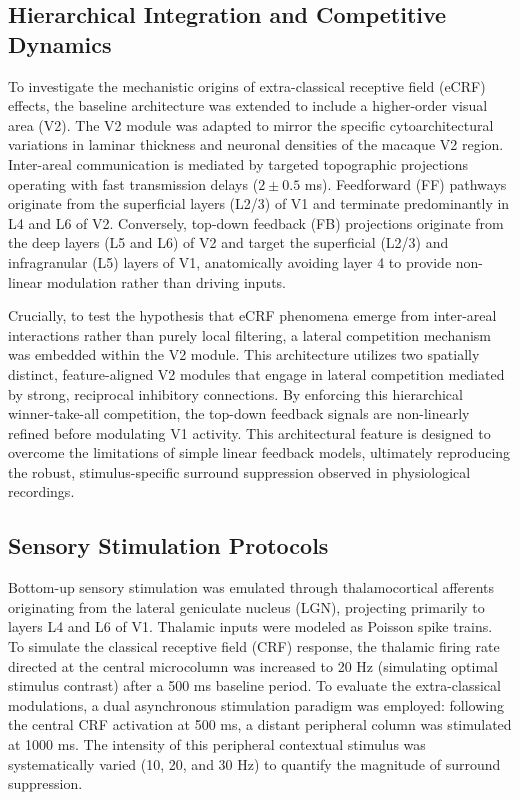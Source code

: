 \subsection{Hierarchical Integration and Competitive Dynamics}
To investigate the mechanistic origins of extra-classical receptive field (eCRF) effects, the baseline architecture was extended to include a higher-order visual area (V2). The V2 module was adapted to mirror the specific cytoarchitectural variations in laminar thickness and neuronal densities of the macaque V2 region. Inter-areal communication is mediated by targeted topographic projections operating with fast transmission delays ($2 \pm 0.5$ ms). Feedforward (FF) pathways originate from the superficial layers (L2/3) of V1 and terminate predominantly in L4 and L6 of V2. Conversely, top-down feedback (FB) projections originate from the deep layers (L5 and L6) of V2 and target the superficial (L2/3) and infragranular (L5) layers of V1, anatomically avoiding layer 4 to provide non-linear modulation rather than driving inputs.

Crucially, to test the hypothesis that eCRF phenomena emerge from inter-areal interactions rather than purely local filtering, a lateral competition mechanism was embedded within the V2 module. This architecture utilizes two spatially distinct, feature-aligned V2 modules that engage in lateral competition mediated by strong, reciprocal inhibitory connections. By enforcing this hierarchical winner-take-all competition, the top-down feedback signals are non-linearly refined before modulating V1 activity. This architectural feature is designed to overcome the limitations of simple linear feedback models, ultimately reproducing the robust, stimulus-specific surround suppression observed in physiological recordings.

\subsection{Sensory Stimulation Protocols}
Bottom-up sensory stimulation was emulated through thalamocortical afferents originating from the lateral geniculate nucleus (LGN), projecting primarily to layers L4 and L6 of V1. Thalamic inputs were modeled as Poisson spike trains. To simulate the classical receptive field (CRF) response, the thalamic firing rate directed at the central microcolumn was increased to 20 Hz (simulating optimal stimulus contrast) after a 500 ms baseline period. To evaluate the extra-classical modulations, a dual asynchronous stimulation paradigm was employed: following the central CRF activation at 500 ms, a distant peripheral column was stimulated at 1000 ms. The intensity of this peripheral contextual stimulus was systematically varied (10, 20, and 30 Hz) to quantify the magnitude of surround suppression.

